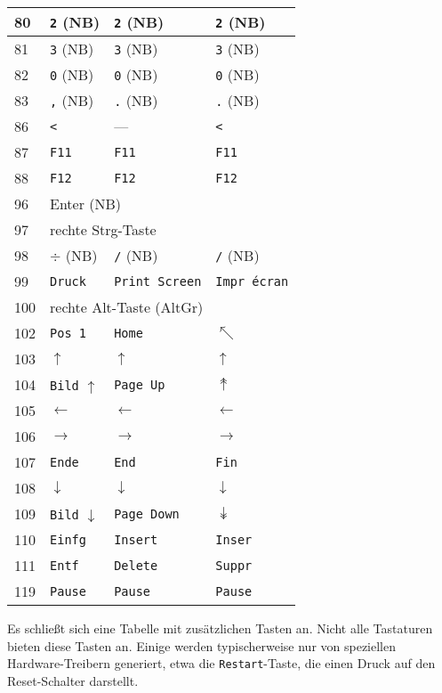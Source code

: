 \begin{longtable}{|l|l|l|l|}
  80 & \texttt{2} (NB) & \texttt{2} (NB) & \texttt{2} (NB) \\ \hline
  81 & \texttt{3} (NB) & \texttt{3} (NB) & \texttt{3} (NB) \\ \hline
  82 & \texttt{0} (NB) & \texttt{0} (NB) & \texttt{0} (NB) \\ \hline
  83 & \texttt{,} (NB) & \texttt{.} (NB) & \texttt{.} (NB) \\ \hline
  86 & \texttt{<} & --- & \texttt{<} \\ \hline
  87 & \texttt{F11} & \texttt{F11} & \texttt{F11} \\ \hline
  88 & \texttt{F12} & \texttt{F12} & \texttt{F12} \\ \hline
  96 & \multicolumn{3}{|l|}{Enter (NB)} \\ \hline
  97 & \multicolumn{3}{|l|}{rechte Strg-Taste} \\ \hline
  98 & $\div$ (NB) & \texttt{/} (NB) & \texttt{/} (NB) \\ \hline
  99 & \texttt{Druck} & \texttt{Print Screen} & \texttt{Impr écran} \\ \hline
  100 & \multicolumn{3}{|l|}{rechte Alt-Taste (AltGr)} \\ \hline
  102 & \texttt{Pos 1} & \texttt{Home} & $\nwarrow$ \\ \hline
  103 & $\uparrow$ & $\uparrow$ & $\uparrow$ \\ \hline
  104 & \texttt{Bild} $\uparrow$ & \texttt{Page Up} & $\twoheaduparrow$ \\ \hline
  105 & $\leftarrow$ & $\leftarrow$ & $\leftarrow$ \\ \hline
  106 & $\rightarrow$ & $\rightarrow$ & $\rightarrow$ \\ \hline
  107 & \texttt{Ende} & \texttt{End} & \texttt{Fin} \\ \hline
  108 & $\downarrow$ & $\downarrow$ & $\downarrow$ \\ \hline
  109 & \texttt{Bild} $\downarrow$ & \texttt{Page Down} & $\twoheaddownarrow$ \\ \hline
  110 & \texttt{Einfg} & \texttt{Insert} & \texttt{Inser} \\ \hline
  111 & \texttt{Entf} & \texttt{Delete} & \texttt{Suppr} \\ \hline
  119 & \texttt{Pause} & \texttt{Pause} & \texttt{Pause} \\ \hline
\end{longtable}

Es schließt sich eine Tabelle mit zusätzlichen Tasten an. Nicht alle
Tastaturen bieten diese Tasten an. Einige werden typischerweise nur von
speziellen Hardware-Treibern generiert, etwa die \texttt{Restart}-Taste, die
einen Druck auf den Reset-Schalter darstellt.

